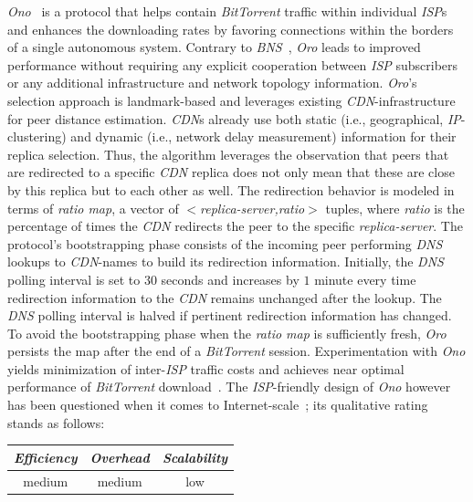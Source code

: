 \emph{Ono}~\cite{CB2008} is a protocol that helps contain
{\sl BitTorrent} traffic within individual \emph{ISP}s
and enhances the downloading rates by favoring connections
within the borders of a single autonomous system. Contrary to
\emph{BNS}~\cite{BCCMSBZ2006},
\emph{Oro} leads to improved performance 
without requiring any explicit cooperation between 
\emph{ISP} subscribers or any additional
infrastructure and network topology information.
\emph{Oro}'s selection approach is 
landmark-based and leverages existing {\sl CDN}-infrastructure 
for peer distance estimation. {\sl CDN}s already use both static (i.e.,
geographical, \emph{IP}-clustering) and dynamic (i.e., network delay measurement)
information for their replica selection. Thus, the algorithm leverages the
observation that peers that are redirected to a specific {\sl CDN} replica does not
only mean that these are close by this replica but to each other as well.
The redirection behavior is modeled in terms of \emph{ratio map}, 
a vector of \emph{$<$replica-server,ratio$>$} tuples, where \emph{ratio} is
the percentage of times the {\sl CDN} redirects the peer 
to the specific \emph{replica-server}.
The protocol's bootstrapping phase consists of the incoming peer performing
{\sl DNS} lookups to {\sl CDN}-names to build its redirection information.
Initially, the {\sl DNS} polling interval is set to $30$ seconds 
and increases by $1$ minute every time redirection information 
to the {\sl CDN} remains unchanged after the lookup.
The {\sl DNS} polling interval is halved if pertinent 
redirection information has changed.
To avoid the bootstrapping phase when the \emph{ratio map} 
is sufficiently fresh, 
\emph{Oro} persists the map after the end of a {\sl BitTorrent} session.
Experimentation with \emph{Ono} yields minimization of
inter-\emph{ISP} traffic costs and achieves near optimal performance 
of {\sl BitTorrent} download~\cite{BCCMSBZ2006}.
The \emph{ISP}-friendly design of \emph{Ono} however has been questioned when 
it comes to Internet-scale~\cite{PMJKA2009,LCLX2009,CLYSR2011};
its qualitative rating stands as follows:
\begin{center}
{\footnotesize
\begin{tabular}{ccc}
\emph{Efficiency} & \emph{Overhead} & \emph{Scalability} \\
\hline
medium &
medium &
low
\end{tabular}
}
\end{center}

